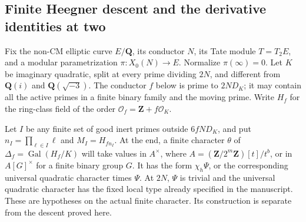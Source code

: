 \documentclass[11pt]{article}
\theoremstyle{definition}
\theoremstyle{remark}
\begin{document}
\subsection{Finite Heegner descent and the derivative identities at two}

Fix the non-CM elliptic curve $E/\mathbf Q$, its conductor $N$, its
Tate module $T=T_2E$, and a modular parametrization
$\pi:X_0(N)\longrightarrow E$. Normalize $\pi(\infty)=0$.
Let $K$ be imaginary quadratic, split at every prime dividing $2N$,
and different from $\mathbf Q(i)$ and $\mathbf Q(\sqrt{-3})$.
The conductor $f$ below is prime to $2ND_K$; it may contain all the
active primes in a finite binary family and the moving prime.
Write $H_f$ for the ring-class field of the order
$\mathcal O_f=\mathbf Z+f\mathcal O_K$.

Let $I$ be any finite set of good inert primes outside $6fND_K$,
and put $n_I=\prod_{\ell\in I}\ell$ and $M_I=H_{fn_I}$.
At the end, a finite character $\theta$ of
$\Delta_f=\operatorname{Gal}(H_f/K)$ will take values in
$A^\times$, where $A=(\mathbf Z/2^m\mathbf Z)[t]/t^b$, or in
$A[G]^\times$ for a finite binary group $G$.
It has the form $\chi_h\Psi$, or the corresponding universal quadratic
character times $\Psi$. At $2N$, $\Psi$ is trivial and the universal
quadratic character has the fixed local type already specified in
the manuscript. These are hypotheses on the actual finite character.
Its construction is separate from the descent proved here.
\end{document}
